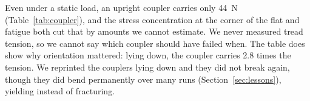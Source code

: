 Even under a static load, an upright coupler carries only \qty{44}{N} (Table~\ref{tab:coupler}), and the stress concentration at the corner of the flat and fatigue both cut that by amounts we cannot estimate. We never measured tread tension, so we cannot say which coupler should have failed when. The table does show why orientation mattered: lying down, the coupler carries 2.8 times the tension. We reprinted the couplers lying down and they did not break again, though they did bend permanently over many runs (Section~\ref{sec:lessons}), yielding instead of fracturing.
